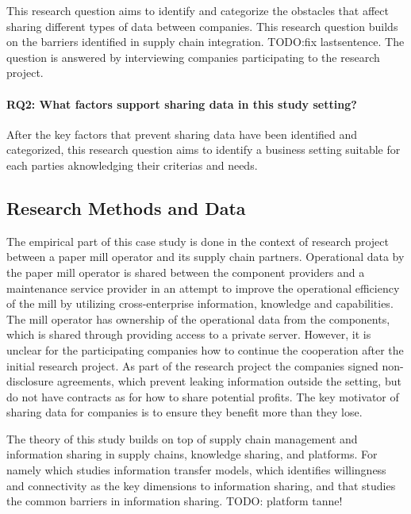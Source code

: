 This research question aims to identify and categorize the obstacles that affect sharing different types of data between companies. This research question builds on the barriers identified in supply chain integration. TODO:fix lastsentence. The question is answered by interviewing companies participating to the research project. 







\paragraph*{RQ2: What factors support sharing data in this study setting?}

After the key factors that prevent sharing data have been identified and categorized, this research question aims to identify a business setting suitable for each parties aknowledging their criterias and needs. 



\subsection{Research Methods and Data}
The empirical part of this case study is done in the context of research project between a paper mill operator and its supply chain partners. Operational data by the paper mill operator is shared between the component providers and a maintenance service provider in an attempt to improve the operational efficiency of the mill by utilizing cross-enterprise information, knowledge and capabilities. The mill operator has ownership of the operational data from the components, which is shared through providing access to a private server. However, it is unclear for the participating companies how to continue the cooperation after the initial research project. As part of the research project the companies signed non-disclosure agreements, which prevent leaking information outside the setting, but do not have contracts as for how to share potential profits. The key motivator of sharing data for companies is to ensure they benefit more than they lose.

The theory of this study builds on top of supply chain management and information sharing in supply chains, knowledge sharing, and platforms. For namely \cite{lee2000information} which studies information transfer models, \cite{croom2007information} which identifies willingness and connectivity as the key dimensions to information sharing, and \cite{} that studies the common barriers in information sharing. TODO: platform tanne!



